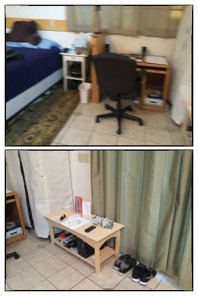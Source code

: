 \begin{figure}
    \centering
     \begin{minipage}{0.19\linewidth}
     \centering
     \includegraphics[width=\linewidth]{FrameNet/Dataset/pred-000001-color.png}\\
     \includegraphics[width=\linewidth]{FrameNet/Dataset/pred-000003-color.png}\\

\end{minipage}
\end{figure}
